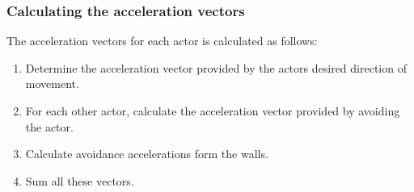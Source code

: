 \subsubsection{Calculating the acceleration vectors}
The acceleration vectors for each actor is calculated as follows:

\begin{enumerate}
    \item Determine the acceleration vector provided by the actors desired 
        direction of movement.
    \item For each other actor, calculate the acceleration vector provided by 
        avoiding the actor.
    \item Calculate avoidance accelerations form the walls.
    \item Sum all these vectors.
\end{enumerate}

%
%
%
%
%
%
%
